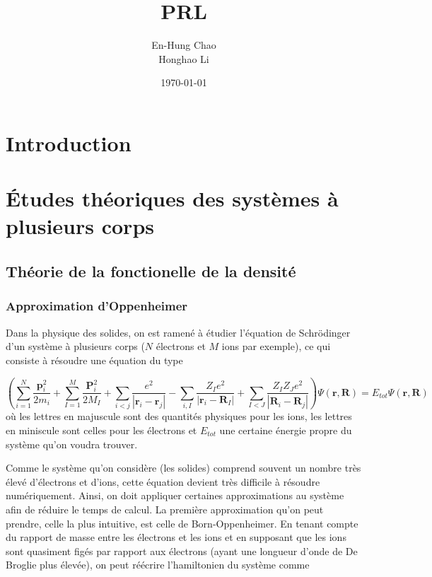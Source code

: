 \documentclass[12pt]{report}
\title{PRL}
\author{En-Hung Chao \\ Honghao Li}
\date{\today}
\theoremstyle{theoreme}
\begin{document}
\maketitle

\newpage
\tableofcontents

\newpage
\chapter{Introduction}


\chapter{Études théoriques des systèmes à plusieurs corps}
\section{Théorie de la fonctionelle de la densité}
\subsection{Approximation d'Oppenheimer}
Dans la physique des solides, on est ramené à étudier l'équation de Schrödinger d'un système à plusieurs corps ($N$ électrons et $M$ ions par exemple), ce qui consiste à résoudre une équation du type

$$
(\sum_{i=1}^N \frac{\textbf{p}_i^2}{2m_i} + \sum_{I=1}^M \frac{\textbf{P}_i^2}{2M_I} 
+ \sum_{i<j}\frac{e^2}{| \textbf{r}_i - \textbf{r}_j |} - \sum_{i, I}\frac{Z_I e^2}{| \textbf{r}_i 
- \textbf{R}_I |} + \sum_{I<J}\frac{Z_I Z_J e^2}{| \textbf{R}_i - \textbf{R}_j |} ) \Psi(\textbf{r}, \textbf{R}) = E_{tot} \Psi(\textbf{r}, \textbf{R})
$$
où les lettres en majuscule sont des quantités physiques pour les ions, les lettres en miniscule sont celles pour les électrons et $E_{tot}$ une certaine énergie propre du système qu'on voudra trouver.

Comme le système qu'on considère (les solides) comprend souvent un nombre très élevé d'électrons et d'ions, cette équation devient très difficile à résoudre numériquement. Ainsi, on doit appliquer certaines approximations au système afin de réduire le temps de calcul. La première approximation qu'on peut prendre, celle la plus intuitive, est celle de Born-Oppenheimer. En tenant compte du rapport de masse entre les électrons et les ions et en supposant que les ions sont quasiment figés par rapport aux électrons (ayant une longueur d'onde de De Broglie plus élevée), on peut réécrire l'hamiltonien du système comme
\end{document}
